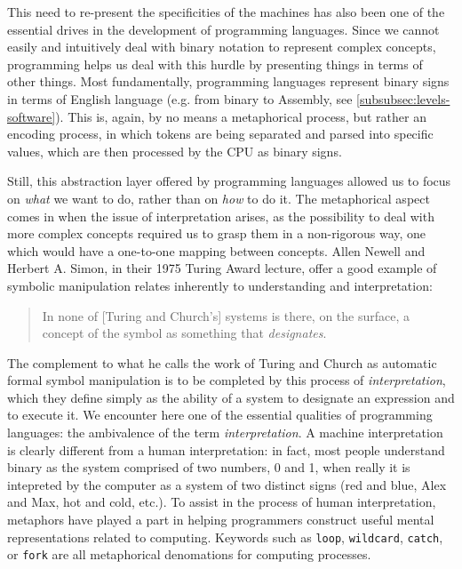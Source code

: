 This need to re-present the specificities of the machines has also been one of the essential drives in the development of programming languages. Since we cannot easily and intuitively deal with binary notation to represent complex concepts, programming helps us deal with this hurdle by presenting things in terms of other things. Most fundamentally, programming languages represent binary signs in terms of English language (e.g. from binary to Assembly, see \autoref{subsubsec:levels-software}). This is, again, by no means a metaphorical process, but rather an encoding process, in which tokens are being separated and parsed into specific values, which are then processed by the CPU as binary signs.

Still, this abstraction layer offered by programming languages allowed us to focus on \emph{what} we want to do, rather than on \emph{how} to do it. The metaphorical aspect comes in when the issue of interpretation arises, as the possibility to deal with more complex concepts required us to grasp them in a non-rigorous way, one which would have a one-to-one mapping between concepts. Allen Newell and Herbert A. Simon, in their 1975 Turing Award lecture, offer a good example of symbolic manipulation relates inherently to understanding and interpretation:

\begin{quote}
    In none of [Turing and Church's] systems is there, on the surface, a concept of the symbol as something that \emph{designates}.
\end{quote}

The complement to what he calls the work of Turing and Church as automatic formal symbol manipulation is to be completed by this process of \emph{interpretation}, which they define simply as the ability of a system to designate an expression and to execute it. We encounter here one of the essential qualities of programming languages: the ambivalence of the term \emph{interpretation}. A machine interpretation is clearly different from a human interpretation: in fact, most people understand binary as the system comprised of two numbers, 0 and 1, when really it is intepreted by the computer as a system of two distinct signs (red and blue, Alex and Max, hot and cold, etc.). To assist in the process of human interpretation, metaphors have played a part in helping programmers construct useful mental representations related to computing. Keywords such as \lstinline{loop}, \lstinline{wildcard}, \lstinline{catch}, or \lstinline{fork} are all metaphorical denomations for computing processes.

